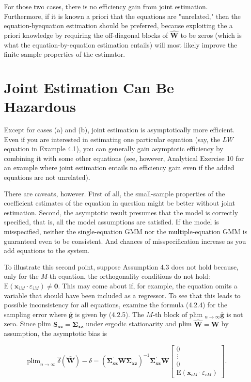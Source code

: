 \documentclass[10pt]{article}
\begin{document}
For those two cases, there is no efficiency gain from joint estimation. Furthermore, if it is known a priori that the equations are "unrelated," then the equation-byequation estimation should be preferred, because exploiting the a priori knowledge by requiring the off-diagonal blocks of $\widehat{\mathbf{W}}$ to be zeros (which is what the equation-by-equation estimation entails) will most likely improve the finite-sample properties of the estimator.

\section*{Joint Estimation Can Be Hazardous}
Except for cases (a) and (b), joint estimation is asymptotically more efficient. Even if you are interested in estimating one particular equation (say, the $L W$ equation in Example 4.1), you can generally gain asymptotic efficiency by combining it with some other equations (see, however, Analytical Exercise 10 for an example where joint estimation entails no efficiency gain even if the added equations are not unrelated).

There are caveats, however. First of all, the small-sample properties of the coefficient estimates of the equation in question might be better without joint estimation. Second, the asymptotic result presumes that the model is correctly specified, that is, all the model assumptions are satisfied. If the model is misspecified, neither the single-equation GMM nor the multiple-equation GMM is guaranteed even to be consistent. And chances of misspecification increase as you add equations to the system.

To illustrate this second point, suppose Assumption 4.3 does not hold because, only for the $M$-th equation, the orthogonality conditions do not hold: $\mathrm{E}\left(\mathbf{x}_{i M} \cdot\right. \left.\varepsilon_{i M}\right) \neq \mathbf{0}$. This may come about if, for example, the equation omits a variable that should have been included as a regressor. To see that this leads to possible inconsistency for all equations, examine the formula (4.2.4) for the sampling error where $\overline{\mathbf{g}}$ is given by (4.2.5). The $M$-th block of plim $_{n \rightarrow \infty} \overline{\mathbf{g}}$ is not zero. Since plim $\mathbf{S}_{\mathbf{x z}}=\mathbf{\Sigma}_{\mathbf{x z}}$ under ergodic stationarity and plim $\widehat{\mathbf{W}}=\mathbf{W}$ by assumption, the asymptotic bias is

\[
\operatorname{plim}_{n \rightarrow \infty} \hat{\delta}(\widehat{\mathbf{W}})-\delta=\left(\boldsymbol{\Sigma}_{\mathbf{x z}}^{\prime} \mathbf{W} \boldsymbol{\Sigma}_{\mathbf{x z}}\right)^{-1} \boldsymbol{\Sigma}_{\mathbf{x z}}^{\prime} \mathbf{W}\left[\begin{array}{c}
0  \tag{4.4.4}\\
\vdots \\
0 \\
\mathrm{E}\left(\mathbf{x}_{i M} \cdot \varepsilon_{i M}\right)
\end{array}\right] .
\]
\end{document}
